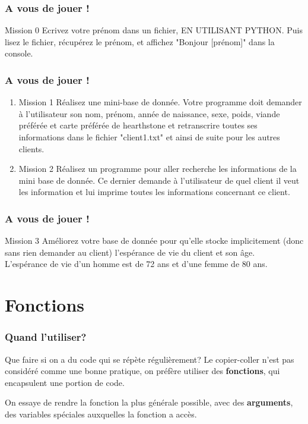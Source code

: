 \documentclass[handout]{beamer}
\begin{document}
\begin{frame}
\frametitle{A vous de jouer !}
        \begin{block}{Mission 0} %
        Ecrivez votre prénom dans un fichier, EN UTILISANT PYTHON. Puis lisez le fichier, récupérez le prénom, et affichez "Bonjour [prénom]" dans la console.
        \end{block}
\end{frame}

\begin{frame}
\frametitle{A vous de jouer !}
    \begin{enumerate}
        \item \begin{block}{Mission 1} %
        Réalisez une mini-base de donnée. Votre programme doit demander à l'utilisateur son nom, prénom, année de naissance, sexe, poids, viande préférée et carte préférée de hearthstone et retranscrire toutes ses informations dans le fichier "client1.txt" et ainsi de suite pour les autres clients.  
        \end{block}
        \item \begin{block}{Mission 2} 
        Réalisez un programme pour aller recherche les informations de la mini base de donnée. Ce dernier demande à l'utilisateur de quel client il veut les information et lui imprime toutes les informations concernant ce client.
        \end{block}
    \end{enumerate}
\end{frame}
\begin{frame}
\frametitle{A vous de jouer !}
\begin{block}{Mission 3} Améliorez votre base de donnée pour qu'elle stocke implicitement (donc sans rien demander au client) l'espérance de vie du client et son âge.\\
        L'espérance de vie d'un homme est de 72 ans et d'une femme de 80 ans.   \end{block}
\end{frame}
\section{Fonctions}

\begin{frame}
\frametitle{Quand l'utiliser?}
Que faire si on a du code qui se répète régulièrement? Le copier-coller n'est pas considéré comme une bonne pratique, on préfère utiliser des \textbf{fonctions}, qui encapsulent une portion de code.

On essaye de rendre la fonction la plus générale possible, avec des \textbf{arguments}, des variables spéciales auxquelles la fonction a accès.
\end{frame}
\end{document}
